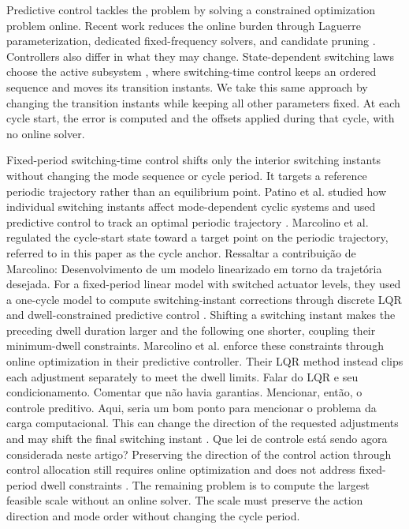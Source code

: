 \documentclass[pdflatex,iicol,sn-mathphys-ay]{sn-jnl}
\newcommand{\red}[1]{{\color{red}#1}}
\begin{document}
Predictive control tackles the problem by solving a constrained optimization problem online. Recent work reduces the online burden through Laguerre parameterization, dedicated fixed-frequency solvers, and candidate pruning \cite{saeed2022laguerre,yang2022fixed,augustine2023mpc}. Controllers also differ in what they may change. State-dependent switching laws choose the active subsystem \cite{egidio2022rank}, where switching-time control keeps an ordered sequence and moves its transition instants. We take this same approach by changing the transition instants while keeping all other parameters fixed. At each cycle start, the error is computed and the offsets applied during that cycle, with no online solver.

Fixed-period switching-time control shifts only the interior switching instants without changing the mode sequence or cycle period. It targets a reference periodic trajectory rather than an equilibrium point. Patino et al. studied how individual switching instants affect mode-dependent cyclic systems and used predictive control to track an optimal periodic trajectory \cite{patino2010}. Marcolino et al. regulated the cycle-start state toward a target point on the periodic trajectory, referred to in this paper as the cycle anchor. \red{Ressaltar a contribuição de Marcolino: Desenvolvimento de um modelo linearizado em torno da trajetória desejada. } For a fixed-period linear model with switched actuator levels, they used a one-cycle model to compute switching-instant corrections through discrete LQR and dwell-constrained predictive control \cite{marcolino2021}. Shifting a switching instant makes the preceding dwell duration larger and the following one shorter, coupling their minimum-dwell constraints. Marcolino et al. enforce these constraints through online optimization in their predictive controller. Their LQR method instead clips each adjustment separately to meet the dwell limits. \red{Falar do LQR e seu condicionamento. Comentar que não havia garantias. Mencionar, então, o controle preditivo. Aqui, seria um bom ponto para mencionar o problema da carga computacional.} This can change the direction of the requested adjustments and may shift the final switching instant \cite{marcolino2021}. \red{Que lei de controle está sendo agora considerada neste artigo?} Preserving the direction of the control action through control allocation still requires online optimization and does not address fixed-period dwell constraints \cite{nakamuraZimmerer2026directionPreserving}. The remaining problem is to compute the largest feasible scale without an online solver. The scale must preserve the action direction and mode order without changing the cycle period.
\end{document}
